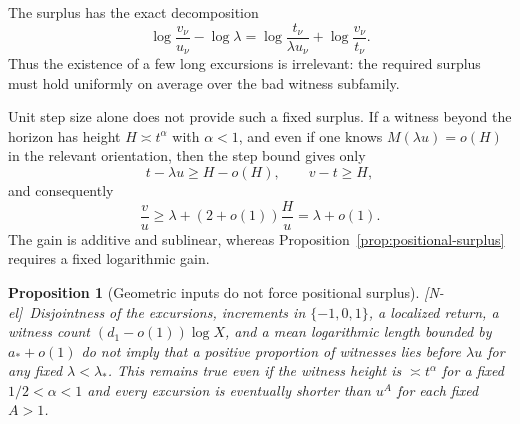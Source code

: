 \documentclass[11pt,reqno]{amsart}
\numberwithin{equation}{section}
\theoremstyle{plain}
\newtheorem{proposition}[theorem]{Proposition}
\theoremstyle{definition}
\theoremstyle{remark}
\newcommand{\tagNE}{\textup{[N-el]}}
\begin{document}
The surplus has the exact decomposition
\begin{equation}
\label{eq:surplus-decomposition}
\log\frac{v_\nu}{u_\nu}-\log\lambda
=
\log\frac{t_\nu}{\lambda u_\nu}
+
\log\frac{v_\nu}{t_\nu}.
\end{equation}
Thus the existence of a few long excursions is irrelevant: the required
surplus must hold uniformly on average over the bad witness subfamily.

Unit step size alone does not provide such a fixed surplus.  If a witness
beyond the horizon has height $H\asymp t^\alpha$ with $\alpha<1$, and even if
one knows $M(\lambda u)=o(H)$ in the relevant orientation, then the step bound
gives only
\begin{equation}
t-\lambda u\ge H-o(H),\qquad v-t\ge H,
\end{equation}
and consequently
\begin{equation}
\frac vu\ge\lambda+(2+o(1))\frac Hu=\lambda+o(1).
\end{equation}
The gain is additive and sublinear, whereas
Proposition~\ref{prop:positional-surplus} requires a fixed logarithmic gain.

\begin{proposition}[Geometric inputs do not force positional surplus]
\label{prop:surplus-nogo}
\tagNE\ Disjointness of the excursions, increments in $\{-1,0,1\}$, a
localized return, a witness count $(d_1-o(1))\log X$, and a mean logarithmic
length bounded by $a_*+o(1)$ do not imply that a positive proportion of
witnesses lies before $\lambda u$ for any fixed $\lambda<\lambda_*$.  This
remains true even if the witness height is $\asymp t^\alpha$ for a fixed
$1/2<\alpha<1$ and every excursion is eventually shorter than $u^A$ for each
fixed $A>1$.
\end{proposition}
\end{document}
